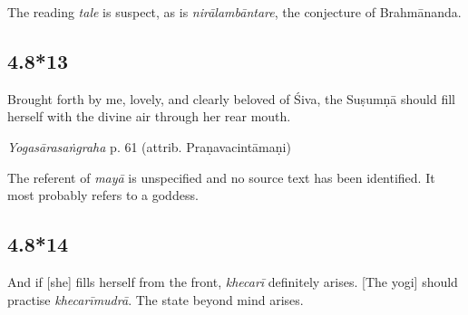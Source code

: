 \begin{ekdosis}
\begin{philcomm}[hp04_008_12]
The reading \emph{tale} is suspect, as is \emph{nirālambāntare}, the conjecture of Brahmānanda.
\end{philcomm}

\subsection*{4.8*13}
\begin{translation}[hp04_008_13]
Brought forth by me, lovely, and clearly beloved of Śiva, the Suṣumṇā should fill herself with the divine air through her rear mouth.
\end{translation}


\begin{testimonia}[hp04_008_13]
\emph{Yogasārasaṅgraha} p. 61 (attrib. Praṇavacintāmaṇi)
\begin{versinnote}
\end{versinnote}
\end{testimonia}

\begin{philcomm}[hp04_008_13]
The referent of \emph{mayā} is unspecified and no source text has been identified. It most probably refers to a goddess.%
\end{philcomm}

\subsection*{4.8*14}
\begin{translation}[hp04_008_14]
And if [she] fills herself from the front, \emph{khecarī} definitely arises. [The yogi] should practise \emph{khecarīmudrā}. The state beyond mind arises.
\end{translation}


\end{ekdosis}
